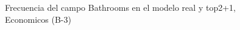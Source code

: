 \begin{figure}[H]
    \centering
    
    \caption{Frecuencia del campo Bathrooms en el modelo real y top2+1, Economicos (B-3)}
    \label{frecuency-Bathrooms-top2+1}
\end{figure}